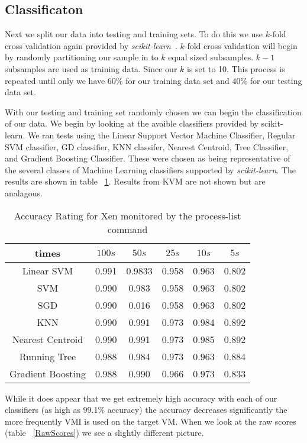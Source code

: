 \subsection{Classificaton}
Next we split our data into testing and training sets. To do this we use $k$-fold cross validation again provided by \textit{scikit-learn}~\cite{pedregosa_scikit-learn:_2011}. $k$-fold cross validation will begin by randomly partitioning our sample in to $k$ equal sized subsamples. $k-1$ subsamples are used as training data. Since our $k$ is set to 10. This process is repeated until only we have 60\% for our training data set and 40\% for our testing data set. 

With our testing and training set randomly chosen we can begin the classification of our data.  We begin by looking at the avaible classifiers provided by scikit-learn. We ran tests using the Linear Support Vector Machine Classifier, Regular SVM classifier, GD classifier, KNN classifer, Nearest Centroid,  Tree Classifier, and Gradient Boosting Classifier. These were chosen as being representative of the several classes of Machine Learning classifiers supported by \textit{scikit-learn}. The results are shown in table ~\ref{Classification Results}. Results from KVM are not shown but are analagous. 

\begin{table}
\centering
  \begin{tabular}{| c | c | c | c | c | c |}
  \hline
  times & $100s$ & $50s$ & $25s$ & $10s$ & $5s$\\ \hline
  Linear SVM & 0.991 & 0.9833 & 0.958 & 0.963 & 0.802 \\ \hline
  SVM  & 0.990 & 0.983 & 0.958 & 0.963 & 0.802 \\ \hline
  SGD  & 0.990 & 0.016 & 0.958 & 0.963 & 0.802 \\ \hline
  KNN  & 0.990 & 0.991 & 0.973 & 0.984 & 0.892 \\ \hline
  Nearest Centroid & 0.990 & 0.991 & 0.973 & 0.985 & 0.892 \\ \hline
  Running Tree & 0.988 & 0.984 & 0.973 & 0.963 & 0.884		\\ \hline
  Gradient Boosting & 0.988 & 0.990 & 0.966 & 0.973 & 0.833 \\ \hline
  \end{tabular}
  \caption{Accuracy Rating for Xen monitored by the process-list command }
  \label{Classification Results}
\end{table}

While it does appear that we get extremely high accuracy with each of our classifiers (as high as 99.1\% accuracy) the accuracy decreases significantly the more frequently VMI is used on the target VM. When we look at the raw scores (table ~\ref{RawScores}) we see a slightly different picture. 

